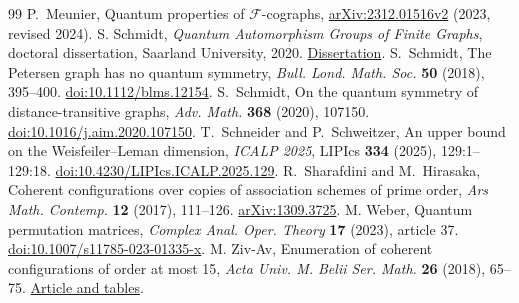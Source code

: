 \documentclass[11pt,reqno]{amsart}
\numberwithin{equation}{section}
\theoremstyle{definition}
\begin{document}
\begin{thebibliography}{99}
P.~Meunier, Quantum properties of $\mathcal F$-cographs,
\href{https://arxiv.org/abs/2312.01516v2}{arXiv:2312.01516v2} (2023, revised 2024).
 S. Schmidt, \emph{Quantum Automorphism Groups of Finite Graphs}, doctoral dissertation, Saarland University, 2020. \href{https://d-nb.info/1216104816/34}{Dissertation}.
S.~Schmidt, The Petersen graph has no quantum symmetry,
\emph{Bull. Lond. Math. Soc.} \textbf{50} (2018), 395--400.
\href{https://doi.org/10.1112/blms.12154}{doi:10.1112/blms.12154}.
S.~Schmidt, On the quantum symmetry of distance-transitive graphs,
\emph{Adv. Math.} \textbf{368} (2020), 107150.
\href{https://doi.org/10.1016/j.aim.2020.107150}{doi:10.1016/j.aim.2020.107150}.
T.~Schneider and P.~Schweitzer, An upper bound on the Weisfeiler--Leman
dimension, \emph{ICALP 2025}, LIPIcs \textbf{334} (2025), 129:1--129:18. \href{https://doi.org/10.4230/LIPIcs.ICALP.2025.129}{doi:10.4230/LIPIcs.ICALP.2025.129}.
R.~Sharafdini and M.~Hirasaka,
Coherent configurations over copies of association schemes of prime order,
\emph{Ars Math. Contemp.} \textbf{12} (2017), 111--126.
\href{https://arxiv.org/abs/1309.3725}{arXiv:1309.3725}.
 M. Weber, Quantum permutation matrices, \emph{Complex Anal. Oper. Theory} \textbf{17} (2023), article 37. \href{https://doi.org/10.1007/s11785-023-01335-x}{doi:10.1007/s11785-023-01335-x}.
 M. Ziv-Av, Enumeration of coherent configurations of order at most 15, \emph{Acta Univ. M. Belii Ser. Math.} \textbf{26} (2018), 65--75. \href{https://actamath.savbb.sk/pdf/aumb2605.pdf}{Article and tables}.
\end{thebibliography}
\end{document}
